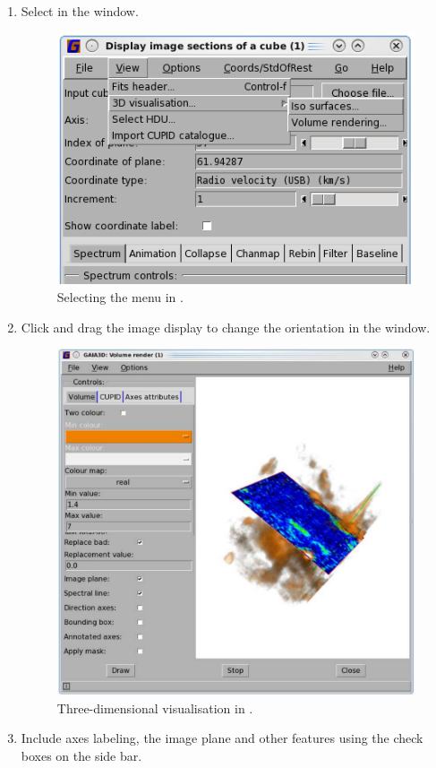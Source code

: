\documentclass[11pt,oneside,chapters]{starlink}
\begin{document}
\begin{enumerate}[label=(\textbf{\arabic*})]
\item Select  in the  window.

\begin{figure}[h!]
\begin{center}
\includegraphics[width=0.45\linewidth]{sc20_gaia_3dmenu}
\caption[Selecting the Volume rendering menu in \gaia.]{\label{fig:gaia_3d}
  Selecting the  menu in \gaia.}
\end{center}
\end{figure}

\item Click and drag the image display to change the orientation in
the  window.

\begin{figure}[h!]
\begin{center}
\includegraphics[width=0.6\linewidth]{sc20_gaia-3dvolume2}
\caption[Three-dimensional visualisation in \gaia.]{\label{fig:gaia_3d2}
  Three-dimensional visualisation in \gaia.}
\end{center}
\end{figure}

\item Include axes labeling, the image plane and other features using
the check boxes on the side bar.
\end{enumerate}
\end{document}
